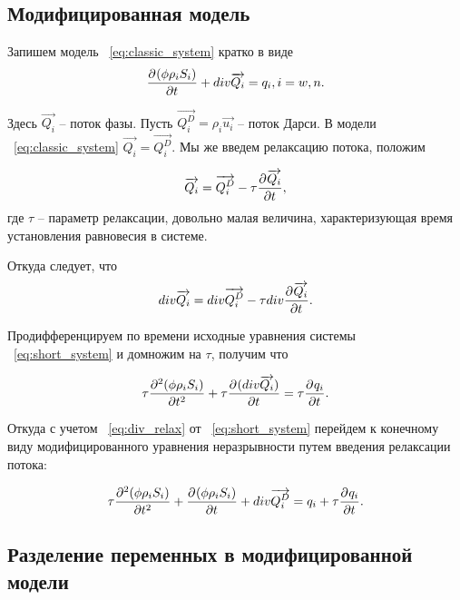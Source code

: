 \subsection{Модифицированная модель}

Запишем модель ~\eqref{eq:classic_system} кратко в виде
\begin{equation} \label{eq:short_system}
   \pd{(\phi \rho_i S_i)}{t} + div \overrightarrow{Q_i} = q_i, i = w,n.
\end{equation}

Здесь $\overrightarrow{Q_i}$ -- поток фазы.
Пусть $\overrightarrow{Q_i^D} = \rho_i \overrightarrow{u_i}$ -- поток Дарси.
В модели ~\eqref{eq:classic_system} $\overrightarrow{Q_i} = \overrightarrow{Q_i^D}$.
Мы же введем релаксацию потока, положим 

\begin{equation}
 \overrightarrow{Q_i} = \overrightarrow{Q_i^D} - \tau \pd{\overrightarrow{Q_i}}{t},
\end{equation}
где $\tau$ -- параметр релаксации, довольно малая величина, характеризующая время установления равновесия в системе.

Откуда следует, что
\begin{equation} \label{eq:div_relax}
 div\overrightarrow{Q_i} = div\overrightarrow{Q_i^D} - \tau div\pd{\overrightarrow{Q_i}}{t}.
\end{equation}

Продифференцируем по времени исходные уравнения системы ~\eqref{eq:short_system} и домножим на $\tau$, получим что

\begin{equation}
  \tau \pd[2]{(\phi \rho_i S_i)}{t} + \tau \pd{(div \overrightarrow{Q_i})}{t} = \tau \pd{q_i}{t}.
\end{equation}

Откуда с учетом ~\eqref{eq:div_relax} от ~\eqref{eq:short_system} перейдем к конечному виду модифицированного уравнения неразрывности
путем введения релаксации потока:

\begin{equation} \label{eq:mod_system}
  \tau \pd[2]{(\phi \rho_i S_i)}{t} + \pd{(\phi \rho_i S_i)}{t} + div \overrightarrow{Q_i^D} = q_i + \tau \pd{q_i}{t}.
\end{equation}



\subsection{Разделение переменных в модифицированной модели}

